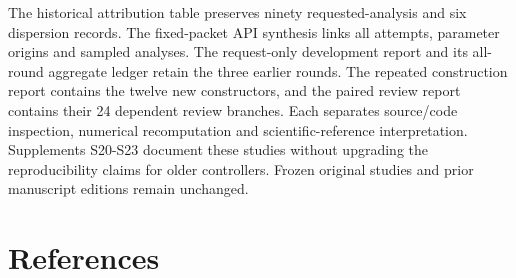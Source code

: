\documentclass[11pt,letterpaper]{article}
\begin{document}
The historical attribution table preserves ninety requested-analysis and six dispersion records. The fixed-packet API synthesis links all attempts, parameter origins and sampled analyses. The request-only development report and its all-round aggregate ledger retain the three earlier rounds. The repeated construction report contains the twelve new constructors, and the paired review report contains their 24 dependent review branches. Each separates source/\allowbreak{}code inspection, numerical recomputation and scientific-reference interpretation. Supplements S20-S23 document these studies without upgrading the reproducibility claims for older controllers. Frozen original studies and prior manuscript editions remain unchanged.


\clearpage

\section*{References}

\begingroup
\end{document}
